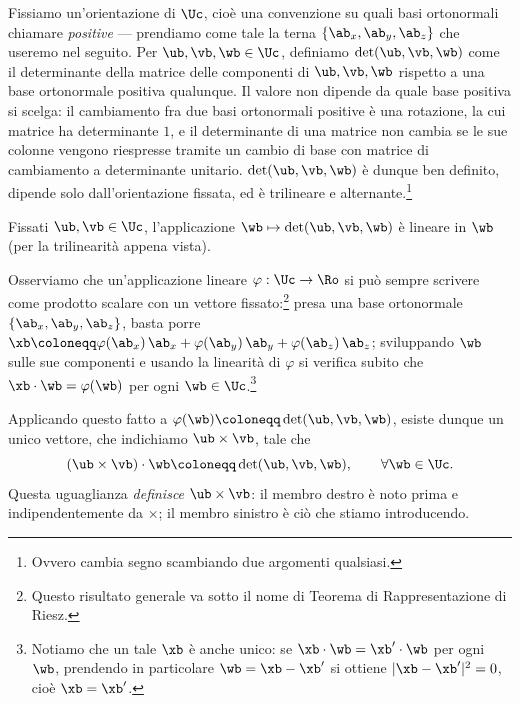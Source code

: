 	Fissiamo un'orientazione di $\Uc$, cioè una convenzione su quali basi
	ortonormali chiamare \emph{positive} --- prendiamo come tale la terna
	$\{\ab_x,\ab_y,\ab_z\}$ che useremo nel seguito. Per $\ub,\vb,\wb\in\Uc$,
	definiamo $\det(\ub,\vb,\wb)$ come il determinante della matrice delle
	componenti di $\ub,\vb,\wb$ rispetto a una base ortonormale positiva
	qualunque. Il valore non dipende da quale base positiva si scelga: il
	cambiamento fra due basi ortonormali positive è una rotazione, la cui
	matrice ha determinante $1$, e il determinante di una matrice non cambia
	se le sue colonne vengono riespresse tramite un cambio di base con
	matrice di cambiamento a determinante unitario. $\det(\ub,\vb,\wb)$ è dunque ben definito, dipende solo
	dall'orientazione fissata, ed è trilineare e alternante.\footnote{Ovvero cambia segno
	scambiando due argomenti qualsiasi.}
	
	Fissati $\ub,\vb\in\Uc$, l'applicazione $\wb\mapsto\det(\ub,\vb,\wb)$ è
	lineare in $\wb$ (per la trilinearità appena vista). 
	
	Osserviamo che un'applicazione
	lineare $\varphi:\Uc\to\Ro$ si può sempre scrivere come prodotto scalare
	con un vettore fissato:\footnote{Questo risultato generale va sotto il nome di Teorema di Rappresentazione di Riesz.\label{riesz}} presa una base ortonormale
	$\{\ab_x,\ab_y,\ab_z\}$, basta porre
	$\xb\coloneqq\varphi(\ab_x)\,\ab_x+\varphi(\ab_y)\,\ab_y+\varphi(\ab_z)\,\ab_z$;
	sviluppando $\wb$ sulle sue componenti e usando la linearità di
	$\varphi$ si verifica subito che $\xb\cdot\wb=\varphi(\wb)$ per ogni
	$\wb\in\Uc$.\footnote{Notiamo che un tale $\xb$ è anche unico: se $\xb\cdot\wb=\xb'\cdot\wb$
	per ogni $\wb$, prendendo in particolare $\wb=\xb-\xb'$ si ottiene
	$|\xb-\xb'|^2=0$, cioè $\xb=\xb'$.}
	
	Applicando questo fatto a $\varphi(\wb)\coloneqq\det(\ub,\vb,\wb)$, esiste
	dunque un unico vettore, che indichiamo $\ub\times\vb$, tale che
	\begin{equation}
		(\ub\times\vb)\cdot \wb\coloneqq\det (\ub, \vb, \wb), \qquad \forall\wb\in\Uc.
	\end{equation}
	Questa uguaglianza \emph{definisce} $\ub\times\vb$: il membro destro è
	noto prima e indipendentemente da $\times$; il membro sinistro è ciò che
	stiamo introducendo. 


